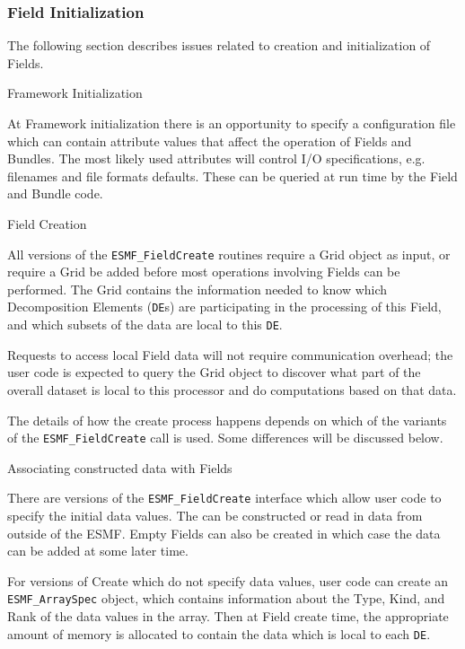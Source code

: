 \subsubsection{Field Initialization}

The following section describes issues related to
creation and initialization of Fields.

\begin{description}

\item{Framework Initialization}
 
At Framework initialization there is an opportunity to 
specify a configuration file which can contain attribute values 
that affect the
operation of Fields and Bundles.  The most likely used
attributes will control I/O specifications, e.g. 
filenames and file formats defaults.  These can be
queried at run time by the Field and Bundle code.

\item{Field Creation}

All versions of the {\tt ESMF\_FieldCreate} 
routines require a Grid object as input, or require a Grid
be added before most operations involving Fields can be performed.
The Grid contains the information needed to know which 
Decomposition Elements ({\tt DE}s) are participating in 
the processing of this Field, and which subsets of the data
are local to this {\tt DE}.

Requests to access local Field data will not require 
communication overhead; the user code is expected to
query the Grid object to discover what part of the
overall dataset is local to this processor and do
computations based on that data.

The details of how the create process happens depends 
on which of the 
variants of the {\tt ESMF\_FieldCreate} call is used.
Some differences will be discussed below.

\item{Associating constructed data with Fields}

There are versions of the {\tt ESMF\_FieldCreate} interface
which allow user code to specify the initial data values.
The can be constructed or read in data from
outside of the ESMF.  Empty Fields can also be created in
which case the data can be added at some later time.

For versions of Create which do not specify data values,
user code can create an {\tt ESMF\_ArraySpec} object, which
contains information about the Type, Kind, and Rank of the
data values in the array.  Then at Field create time, the
appropriate amount of memory is allocated to contain the
data which is local to each {\tt DE}.


\end{description}
